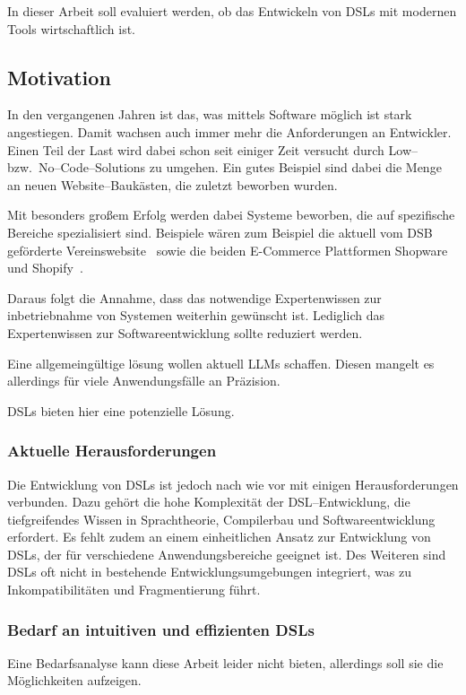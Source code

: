 In dieser Arbeit soll evaluiert werden, ob das Entwickeln von \acp{DSL} mit modernen Tools wirtschaftlich ist.

\subsection{Motivation}\label{subsec:motivation}
In den vergangenen Jahren ist das, was mittels Software möglich ist stark angestiegen.
Damit wachsen auch immer mehr die Anforderungen an Entwickler.
Einen Teil der Last wird dabei schon seit einiger Zeit versucht durch Low-- bzw.\ No--Code--Solutions zu umgehen.
Ein gutes Beispiel sind dabei die Menge an neuen Website--Baukästen, die zuletzt beworben wurden. \autocite{p-2024}

Mit besonders großem Erfolg werden dabei Systeme beworben, die auf spezifische Bereiche spezialisiert sind.
Beispiele wären zum Beispiel die aktuell vom DSB geförderte Vereinswebsite~\autocite{deutscher-olympischer-sportbund-ev-no-date} sowie die beiden E-Commerce Plattformen Shopware~\autocite{ag-no-date} und Shopify~\autocite{shopify-international-ltd-no-date}.

Daraus folgt die Annahme, dass das notwendige Expertenwissen zur inbetriebnahme von Systemen weiterhin gewünscht ist.
Lediglich das Expertenwissen zur Softwareentwicklung sollte reduziert werden.

Eine allgemeingültige lösung wollen aktuell \acp{LLM} schaffen.
Diesen mangelt es allerdings für viele Anwendungsfälle an Präzision.

\acp{DSL} bieten hier eine potenzielle Lösung.

\subsubsection{Aktuelle Herausforderungen}
Die Entwicklung von \acp{DSL} ist jedoch nach wie vor mit einigen Herausforderungen verbunden.
Dazu gehört die hohe Komplexität der \ac{DSL}--Entwicklung, die tiefgreifendes Wissen in Sprachtheorie, Compilerbau und Softwareentwicklung erfordert.
Es fehlt zudem an einem einheitlichen Ansatz zur Entwicklung von \acp{DSL}, der für verschiedene Anwendungsbereiche geeignet ist.
Des Weiteren sind \acp{DSL} oft nicht in bestehende Entwicklungsumgebungen integriert, was zu Inkompatibilitäten und Fragmentierung führt.

\subsubsection{Bedarf an intuitiven und effizienten \acp{DSL}}
Eine Bedarfsanalyse kann diese Arbeit leider nicht bieten, allerdings soll sie die Möglichkeiten aufzeigen.


